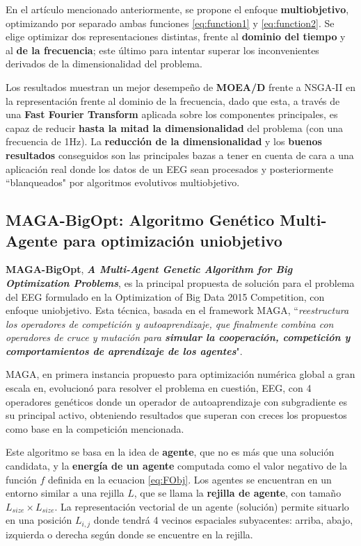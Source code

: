 En el artículo mencionado anteriormente, se propone el enfoque \textbf{multiobjetivo}, optimizando por separado ambas funciones \ref{eq:function1} y \ref{eq:function2}. Se elige optimizar dos representaciones distintas, frente al \textbf{dominio del tiempo} y al \textbf{de la frecuencia}; este último para intentar superar los inconvenientes derivados de la dimensionalidad del problema.

Los resultados muestran un mejor desempeño de \textbf{MOEA/D} frente a NSGA-II en la representación frente al dominio de la frecuencia, dado que esta, a través de una \textbf{Fast Fourier Transform} aplicada sobre los componentes principales, es capaz de reducir \textbf{hasta la mitad la dimensionalidad} del problema (con una frecuencia de 1Hz). La \textbf{reducción de la dimensionalidad} y los\textbf{ buenos resultados} conseguidos son las principales bazas a tener en cuenta de cara a una aplicación real donde los datos de un EEG sean procesados y posteriormente ``blanqueados" por algoritmos evolutivos multiobjetivo.

\subsection{MAGA-BigOpt: Algoritmo Genético Multi-Agente para optimización uniobjetivo}

\textbf{MAGA-BigOpt}, \textbf{\textit{A Multi-Agent Genetic Algorithm for Big Optimization Problems}}\cite{MAGA-BigOpt}, es la principal propuesta de solución para el problema del EEG formulado en la Optimization of Big Data 2015 Competition, con enfoque uniobjetivo. Esta técnica, basada en el framework MAGA\cite{MAGA}, ``\textit{reestructura los operadores de competición y autoaprendizaje, que finalmente combina con operadores de cruce y mutación para \textbf{simular la cooperación, competición y comportamientos de aprendizaje de los agentes}}".

MAGA, en primera instancia propuesto para optimización numérica global a gran escala en\cite{MAGA}, evolucionó para resolver el problema en cuestión, EEG, con 4 operadores genéticos donde un operador de autoaprendizaje con subgradiente es su principal activo, obteniendo resultados que superan con creces los propuestos como base en la competición mencionada.

Este algoritmo se basa en la idea de \textbf{agente}, que no es más que una solución candidata, y la \textbf{energía de un agente} computada como el valor negativo de la función $f$ definida en la ecuacion \ref{eq:FObj}. Los agentes se encuentran en un entorno similar a una rejilla $L$, que se llama la \textbf{rejilla de agente}, con tamaño $L_{size}\times L_{size}$. La representación vectorial de un agente (solución) permite situarlo en una posición $L_{i,j}$ donde tendrá 4 vecinos espaciales subyacentes: arriba, abajo, izquierda o derecha según donde se encuentre en la rejilla. 

